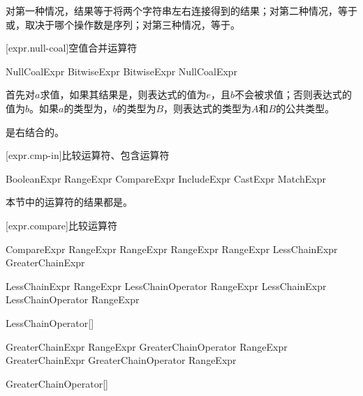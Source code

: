 对第一种情况，结果等于将两个字符串左右连接得到的结果；对第二种情况，等于\tcode{[$x$, ...$y$]}或\tcode{[...$x$, $y$]}，取决于哪个操作数是序列；对第三种情况，等于\tcode{[...$x$, ...$y$]}。

[expr.null-coal]{空值合并运算符}

\begin{bnf}{NullCoalExpr}
    BitwiseExpr \br
    BitwiseExpr  NullCoalExpr
\end{bnf}

\pnum
{}首先对$a$求值，如果其结果是，则表达式的值为$e$，且$b$不会被求值；否则表达式的值为$b$。如果$a$的类型为，$b$的类型为$B$，则表达式的类型为$A$和$B$的公共类型。

\pnum
{}是右结合的。

[expr.cmp-in]{比较运算符、包含运算符}

\begin{bnf}{BooleanExpr}
    RangeExpr \br
    CompareExpr \br
    IncludeExpr \br
    CastExpr \br
    MatchExpr
\end{bnf}

\pnum
本节中的运算符的结果都是。

[expr.compare]{比较运算符}

\begin{bnf}{CompareExpr}
    RangeExpr \terminal{!=} RangeExpr \br
    RangeExpr  RangeExpr \br
    LessChainExpr \br
    GreaterChainExpr
\end{bnf}

\begin{bnf}{LessChainExpr}
    RangeExpr LessChainOperator RangeExpr \br
    LessChainExpr LessChainOperator RangeExpr
\end{bnf}

\begin{bnf}{LessChainOperator}[\oneof]
    \terminal{< == <=}
\end{bnf}

\begin{bnf}{GreaterChainExpr}
    RangeExpr GreaterChainOperator RangeExpr \br
    GreaterChainExpr GreaterChainOperator RangeExpr
\end{bnf}

\begin{bnf}{GreaterChainOperator}[\oneof]
    \terminal{> == >=}
\end{bnf}

